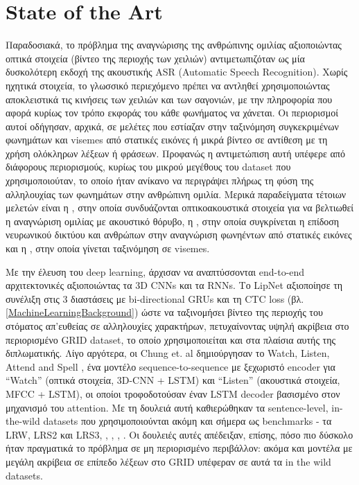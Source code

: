 \section{State of the Art}
\label{StateOfTheArt}

Παραδοσιακά, το πρόβλημα της αναγνώρισης της ανθρώπινης ομιλίας αξιοποιώντας οπτικά στοιχεία (βίντεο της περιοχής των χειλιών) αντιμετωπιζόταν ως μία δυσκολότερη εκδοχή της ακουστικής ASR (Automatic Speech Recognition). Χωρίς ηχητικά στοιχεία, το γλωσσικό περιεχόμενο πρέπει να αντληθεί χρησιμοποιώντας αποκλειστικά τις κινήσεις των χειλιών και των σαγονιών, με την πληροφορία που αφορά κυρίως τον τρόπο εκφοράς του κάθε φωνήματος να χάνεται. Οι περιορισμοί αυτοί οδήγησαν, αρχικά, σε μελέτες που εστίαζαν στην ταξινόμηση συγκεκριμένων φωνημάτων και visemes από στατικές εικόνες ή μικρά βίντεο σε αντίθεση με τη χρήση ολόκληρων λέξεων ή φράσεων. Προφανώς η αντιμετώπιση αυτή υπέφερε από διάφορους περιορισμούς, κυρίως του μικρού μεγέθους του dataset που χρησιμοποιούταν, το οποίο ήταν ανίκανο να περιγράψει πλήρως τη φύση της αλληλουχίας των φωνημάτων στην ανθρώπινη ομιλία. Μερικά παραδείγματα τέτοιων μελετών είναι η \cite{Yuhas1989IntegrationOA}, στην οποία συνδυάζονται οπτικοακουστικά στοιχεία για να βελτιωθεί η αναγνώριση ομιλίας με ακουστικό θόρυβο, η \cite{10.1121/1.401235}, στην οποία συγκρίνεται η επίδοση νευρωνικού δικτύου και ανθρώπων στην αναγνώριση φωνηέντων από στατικές εικόνες και η \cite{inbook}, στην οποία γίνεται ταξινόμηση σε visemes.

Με την έλευση του deep learning, άρχισαν να αναπτύσσονται end-to-end αρχιτεκτονικές αξιοποιώντας τα 3D CNNs και τα RNNs. Το LipNet \cite{assael2016lipnetendtoendsentencelevellipreading} αξιοποίησε τη συνέλιξη στις 3 διαστάσεις με bi-directional GRUs και τη CTC loss (βλ. \ref{MachineLearningBackground}) ώστε να ταξινομήσει βίντεο της περιοχής του στόματος απ'ευθείας σε αλληλουχίες χαρακτήρων, πετυχαίνοντας υψηλή ακρίβεια στο περιορισμένο GRID dataset, το οποίο χρησιμοποιείται και στα πλαίσια αυτής της διπλωματικής. Λίγο αργότερα, οι Chung et. al δημιούργησαν το Watch, Listen, Attend and Spell \cite{Chung17}, ένα μοντέλο sequence-to-sequence με ξεχωριστό encoder για ``Watch'' (οπτικά στοιχεία, 3D-CNN + LSTM) και ``Listen'' (ακουστικά στοιχεία, MFCC + LSTM), οι οποίοι τροφοδοτούσαν έναν LSTM decoder βασισμένο στον μηχανισμό του attention. Με τη δουλειά αυτή καθιερώθηκαν τα sentence-level, in-the-wild datasets που χρησιμοποιούνται ακόμη και σήμερα ως benchmarks - τα LRW, LRS2 και LRS3, \cite{Afouras18c}, \cite{Chung16}, \cite{Chung17}, \cite{Chung17a}. Οι δουλειές αυτές απέδειξαν, επίσης, πόσο πιο δύσκολο ήταν πραγματικά το πρόβλημα σε μη περιορισμένο περιβάλλον: ακόμα και μοντέλα με μεγάλη ακρίβεια σε επίπεδο λέξεων στο GRID υπέφεραν σε αυτά τα in the wild datasets.

